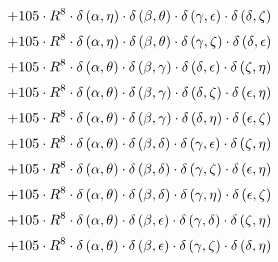 \begin{subequations}
\begin{gather}
 \\[0.2em] \notag 		 + 105 \cdot R^{8} \cdot \delta{}\left(\alpha{}, \eta{}\right) \cdot \delta{}\left(\beta{}, \theta{}\right) \cdot \delta{}\left(\gamma{}, \epsilon{}\right) \cdot \delta{}\left(\delta{}, \zeta{}\right) 
 \\[0.2em] \notag 		 + 105 \cdot R^{8} \cdot \delta{}\left(\alpha{}, \eta{}\right) \cdot \delta{}\left(\beta{}, \theta{}\right) \cdot \delta{}\left(\gamma{}, \zeta{}\right) \cdot \delta{}\left(\delta{}, \epsilon{}\right) 
 \\[0.2em] \notag 		 + 105 \cdot R^{8} \cdot \delta{}\left(\alpha{}, \theta{}\right) \cdot \delta{}\left(\beta{}, \gamma{}\right) \cdot \delta{}\left(\delta{}, \epsilon{}\right) \cdot \delta{}\left(\zeta{}, \eta{}\right) 
 \\[0.2em] \notag 		 + 105 \cdot R^{8} \cdot \delta{}\left(\alpha{}, \theta{}\right) \cdot \delta{}\left(\beta{}, \gamma{}\right) \cdot \delta{}\left(\delta{}, \zeta{}\right) \cdot \delta{}\left(\epsilon{}, \eta{}\right) 
 \\[0.2em] \notag 		 + 105 \cdot R^{8} \cdot \delta{}\left(\alpha{}, \theta{}\right) \cdot \delta{}\left(\beta{}, \gamma{}\right) \cdot \delta{}\left(\delta{}, \eta{}\right) \cdot \delta{}\left(\epsilon{}, \zeta{}\right) 
 \\[0.2em] \notag 		 + 105 \cdot R^{8} \cdot \delta{}\left(\alpha{}, \theta{}\right) \cdot \delta{}\left(\beta{}, \delta{}\right) \cdot \delta{}\left(\gamma{}, \epsilon{}\right) \cdot \delta{}\left(\zeta{}, \eta{}\right) 
 \\[0.2em] \notag 		 + 105 \cdot R^{8} \cdot \delta{}\left(\alpha{}, \theta{}\right) \cdot \delta{}\left(\beta{}, \delta{}\right) \cdot \delta{}\left(\gamma{}, \zeta{}\right) \cdot \delta{}\left(\epsilon{}, \eta{}\right) 
 \\[0.2em] \notag 		 + 105 \cdot R^{8} \cdot \delta{}\left(\alpha{}, \theta{}\right) \cdot \delta{}\left(\beta{}, \delta{}\right) \cdot \delta{}\left(\gamma{}, \eta{}\right) \cdot \delta{}\left(\epsilon{}, \zeta{}\right) 
 \\[0.2em] \notag 		 + 105 \cdot R^{8} \cdot \delta{}\left(\alpha{}, \theta{}\right) \cdot \delta{}\left(\beta{}, \epsilon{}\right) \cdot \delta{}\left(\gamma{}, \delta{}\right) \cdot \delta{}\left(\zeta{}, \eta{}\right) 
 \\[0.2em] \notag 		 + 105 \cdot R^{8} \cdot \delta{}\left(\alpha{}, \theta{}\right) \cdot \delta{}\left(\beta{}, \epsilon{}\right) \cdot \delta{}\left(\gamma{}, \zeta{}\right) \cdot \delta{}\left(\delta{}, \eta{}\right) 

\end{gather}
\end{subequations}
